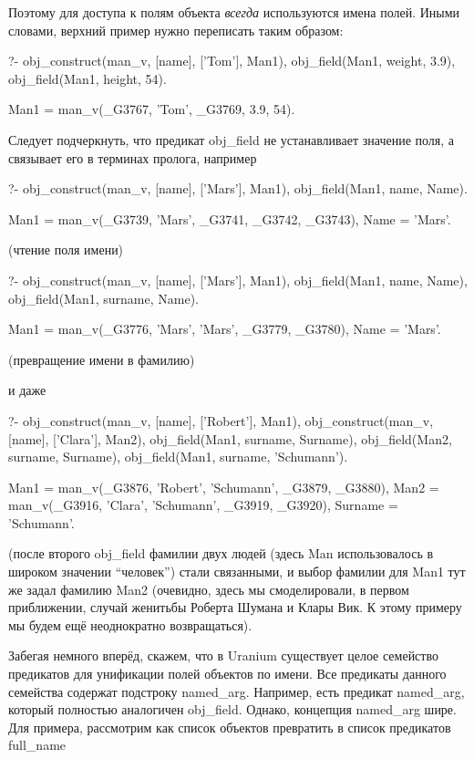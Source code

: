 \documentclass[a4paper]{book}
\def\ur{Uranium}
\begin{document}
Поэтому для доступа к полям объекта {\it всегда\/} используются
имена полей. Иными словами, верхний пример нужно переписать таким
образом:

\begin{example}{}{}
?- obj_construct(man_v, [name], ['Tom'], Man1), 
   obj_field(Man1, weight, 3.9), 
   obj_field(Man1, height, 54).

Man1 = man_v(_G3767, 'Tom', _G3769, 3.9, 54).
\end{example}

Следует подчеркнуть, что предикат obj\_field не устанавливает
значение поля, а связывает его в терминах пролога, например

\begin{example}{}{}
?- obj_construct(man_v, [name], ['Mars'], Man1), 
   obj_field(Man1, name, Name).

Man1 = man_v(_G3739, 'Mars', _G3741, _G3742, _G3743),
Name = 'Mars'.
\end{example}
(чтение поля имени)

\begin{example}{}{}
?- obj_construct(man_v, [name], ['Mars'], Man1), 
   obj_field(Man1, name, Name), 
   obj_field(Man1, surname, Name).

Man1 = man_v(_G3776, 'Mars', 'Mars', _G3779, _G3780),
Name = 'Mars'.
\end{example}
(превращение имени в фамилию)

и даже

\begin{example}{}{}
?- obj_construct(man_v, [name], ['Robert'], Man1), 
   obj_construct(man_v, [name], ['Clara'], Man2), 
   obj_field(Man1, surname, Surname), 
   obj_field(Man2, surname, Surname), 
   obj_field(Man1, surname, 'Schumann').

Man1 = man_v(_G3876, 'Robert', 'Schumann', _G3879, _G3880),
Man2 = man_v(_G3916, 'Clara', 'Schumann', _G3919, _G3920),
Surname = 'Schumann'.
\end{example}

(после второго obj\_field фамилии двух людей (здесь Man
использовалось в широком значении ``человек'') стали связанными,
и выбор фамилии для Man1 тут же задал фамилию Man2 (очевидно,
здесь мы смоделировали, в первом приближении, случай женитьбы
Роберта Шумана и Клары Вик. К этому примеру мы будем ещё
неоднократно возвращаться).

Забегая немного вперёд, скажем, что в \ur{} существует целое
семейство предикатов для унификации полей объектов по имени. Все
предикаты данного семейства содержат подстроку
named\_arg. Например, есть предикат named\_arg, который полностью
аналогичен obj\_field. Однако, концепция named\_arg шире. Для
примера, рассмотрим как список объектов превратить в список
предикатов full\_name
\end{document}
